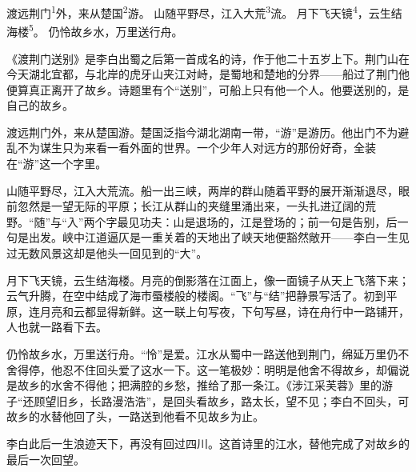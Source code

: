 
\begin{poem}
渡远荆门\textsuperscript{1}外，来从楚国\textsuperscript{2}游。
山随平野尽，江入大荒\textsuperscript{3}流。
月下飞天镜\textsuperscript{4}，云生结海楼\textsuperscript{5}。
仍怜故乡水，万里送行舟。
\end{poem}

\begin{annotations}
\end{annotations}

\begin{appreciation}
《渡荆门送别》是李白出蜀之后第一首成名的诗，作于他二十五岁上下。荆门山在今天湖北宜都，与北岸的虎牙山夹江对峙，是蜀地和楚地的分界——船过了荆门他便算真正离开了故乡。诗题里有个“送别”，可船上只有他一个人。他要送别的，是自己的故乡。

渡远荆门外，来从楚国游。楚国泛指今湖北湖南一带，“游”是游历。他出门不为避乱不为谋生只为来看一看外面的世界。一个少年人对远方的那份好奇，全装在“游”这一个字里。

山随平野尽，江入大荒流。船一出三峡，两岸的群山随着平野的展开渐渐退尽，眼前忽然是一望无际的平原；长江从群山的夹缝里涌出来，一头扎进辽阔的荒野。“随”与“入”两个字最见功夫：山是退场的，江是登场的；前一句是告别，后一句是出发。峡中江道逼仄是一重关着的天地出了峡天地便豁然敞开——李白一生见过无数风景这却是他头一回见到的“大”。

月下飞天镜，云生结海楼。月亮的倒影落在江面上，像一面镜子从天上飞落下来；云气升腾，在空中结成了海市蜃楼般的楼阁。“飞”与“结”把静景写活了。初到平原，连月亮和云都显得新鲜。这一联上句写夜，下句写昼，诗在舟行中一路铺开，人也就一路看下去。

仍怜故乡水，万里送行舟。“怜”是爱。江水从蜀中一路送他到荆门，绵延万里仍不舍得停，他忍不住回头爱了这水一下。这一笔极妙：明明是他舍不得故乡，却偏说是故乡的水舍不得他；把满腔的乡愁，推给了那一条江。《涉江采芙蓉》里的游子“还顾望旧乡，长路漫浩浩”，是回头看故乡，路太长，望不见；李白不回头，可故乡的水替他回了头，一路送到他看不见故乡为止。

李白此后一生浪迹天下，再没有回过四川。这首诗里的江水，替他完成了对故乡的最后一次回望。
\end{appreciation}
